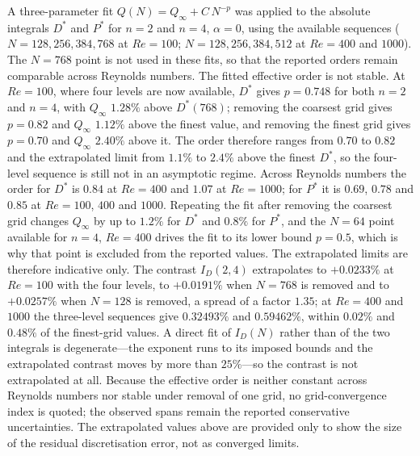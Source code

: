 A three-parameter fit $Q(N)=Q_\infty+C\,N^{-p}$ was applied to the absolute integrals $D^*$ and $P^*$ for $n=2$ and $n=4$, $\alpha=0$, using the available sequences ($N=128,256,384,768$ at $Re=100$; $N=128,256,384,512$ at $Re=400$ and $1000$). The $N=768$ point is not used in these fits, so that the reported orders remain comparable across Reynolds numbers. The fitted effective order is not stable. At $Re=100$, where four levels are now available, $D^*$ gives $p=0.748$ for both $n=2$ and $n=4$, with $Q_\infty$ $1.28\%$ above $D^*(768)$; removing the coarsest grid gives $p=0.82$ and $Q_\infty$ $1.12\%$ above the finest value, and removing the finest grid gives $p=0.70$ and $Q_\infty$ $2.40\%$ above it. The order therefore ranges from $0.70$ to $0.82$ and the extrapolated limit from $1.1\%$ to $2.4\%$ above the finest $D^*$, so the four-level sequence is still not in an asymptotic regime. Across Reynolds numbers the order for $D^*$ is $0.84$ at $Re=400$ and $1.07$ at $Re=1000$; for $P^*$ it is $0.69$, $0.78$ and $0.85$ at $Re=100$, $400$ and $1000$. Repeating the fit after removing the coarsest grid changes $Q_\infty$ by up to $1.2\%$ for $D^*$ and $0.8\%$ for $P^*$, and the $N=64$ point available for $n=4$, $Re=400$ drives the fit to its lower bound $p=0.5$, which is why that point is excluded from the reported values. The extrapolated limits are therefore indicative only. The contrast $I_D(2,4)$ extrapolates to $+0.0233\%$ at $Re=100$ with the four levels, to $+0.0191\%$ when $N=768$ is removed and to $+0.0257\%$ when $N=128$ is removed, a spread of a factor $1.35$; at $Re=400$ and $1000$ the three-level sequences give $0.32493\%$ and $0.59462\%$, within $0.02\%$ and $0.48\%$ of the finest-grid values. A direct fit of $I_D(N)$ rather than of the two integrals is degenerate---the exponent runs to its imposed bounds and the extrapolated contrast moves by more than $25\%$---so the contrast is not extrapolated at all. Because the effective order is neither constant across Reynolds numbers nor stable under removal of one grid, no grid-convergence index is quoted; the observed spans remain the reported conservative uncertainties. The extrapolated values above are provided only to show the size of the residual discretisation error, not as converged limits.

